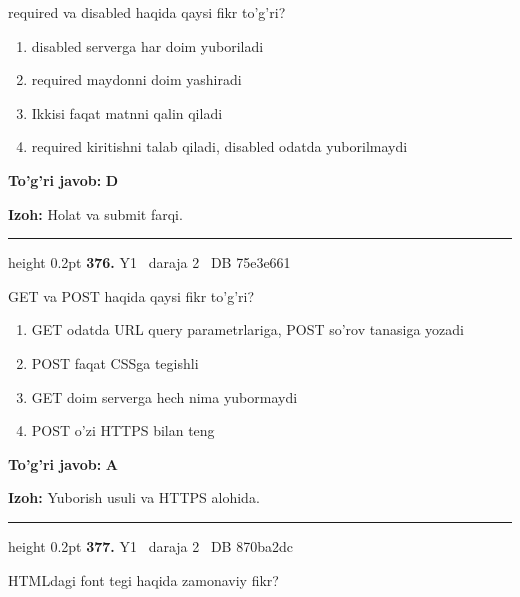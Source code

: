 \documentclass[10pt,a4paper,oneside]{article}
\begin{document}
\par
required va disabled haqida qaysi fikr to'g'ri?
\begin{enumerate}[label=\Alph*),leftmargin=9mm]
\item disabled serverga har doim yuboriladi
\item required maydonni doim yashiradi
\item Ikkisi faqat matnni qalin qiladi
\item required kiritishni talab qiladi, disabled odatda yuborilmaydi
\end{enumerate}
\begin{tcolorbox}[enhanced,breakable,colback=teal!4,colframe=teal!45!black,boxrule=0.45pt,arc=1.2mm,left=2.8mm,right=2.8mm,top=2mm,bottom=2mm,before skip=2mm,after skip=2mm]
\textbf{\color{teal}To'g'ri javob:} \textbf{D}
\par\smallskip
\textbf{Izoh:} Holat va submit farqi.
\end{tcolorbox}
\vspace{2mm}\hrule height 0.2pt \vspace{4mm}
\hypertarget{q376}{\textbf{\color{ink}376.}}  {\color{muted}\scriptsize Y1 \textbullet\ daraja 2 \textbullet\ DB 75e3e661}
\par
GET va POST haqida qaysi fikr to'g'ri?
\begin{enumerate}[label=\Alph*),leftmargin=9mm]
\item GET odatda URL query parametrlariga, POST so'rov tanasiga yozadi
\item POST faqat CSSga tegishli
\item GET doim serverga hech nima yubormaydi
\item POST o'zi HTTPS bilan teng
\end{enumerate}
\begin{tcolorbox}[enhanced,breakable,colback=teal!4,colframe=teal!45!black,boxrule=0.45pt,arc=1.2mm,left=2.8mm,right=2.8mm,top=2mm,bottom=2mm,before skip=2mm,after skip=2mm]
\textbf{\color{teal}To'g'ri javob:} \textbf{A}
\par\smallskip
\textbf{Izoh:} Yuborish usuli va HTTPS alohida.
\end{tcolorbox}
\vspace{2mm}\hrule height 0.2pt \vspace{4mm}
\hypertarget{q377}{\textbf{\color{ink}377.}}  {\color{muted}\scriptsize Y1 \textbullet\ daraja 2 \textbullet\ DB 870ba2dc}
\par
HTMLdagi font tegi haqida zamonaviy fikr?
\end{document}
